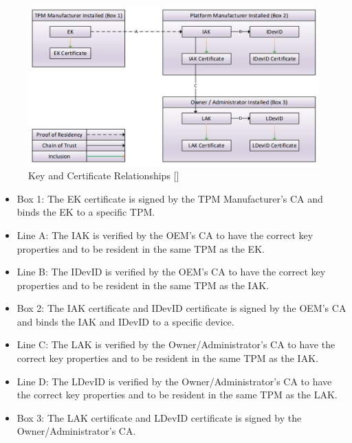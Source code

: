 \begin{figure}[h]
  \begin{centering}
  \includegraphics[width=.8\linewidth]{chap_3_figures/certificateRelationships.jpg}
  \par\end{centering}
  \caption{Key and Certificate Relationships [\cite{DevIDSpec-TCG}]}
  \label{fig:cert_rel}
\end{figure}

\begin{itemize}[itemsep=0pt,parsep=0pt,partopsep=0pt]
  \item Box 1: The EK certificate is signed by the TPM Manufacturer's CA and binds the EK to a specific TPM.
  \item Line A: The IAK is verified by the OEM's CA to have the correct key properties and to be resident in the same TPM as the EK.
  \item Line B: The IDevID is verified by the OEM's CA to have the correct key properties and to be resident in the same TPM as the IAK.
  \item Box 2: The IAK certificate and IDevID certificate is signed by the OEM's CA and binds the IAK and IDevID to a specific device.
  \item Line C: The LAK is verified by the Owner/Administrator's CA to have the correct key properties and to be resident in the same TPM as the IAK.
  \item Line D: The LDevID is verified by the Owner/Administrator's CA to have the correct key properties and to be resident in the same TPM as the LAK.
  \item Box 3: The LAK certificate and LDevID certificate is signed by the Owner/Administrator's CA.
\end{itemize}

